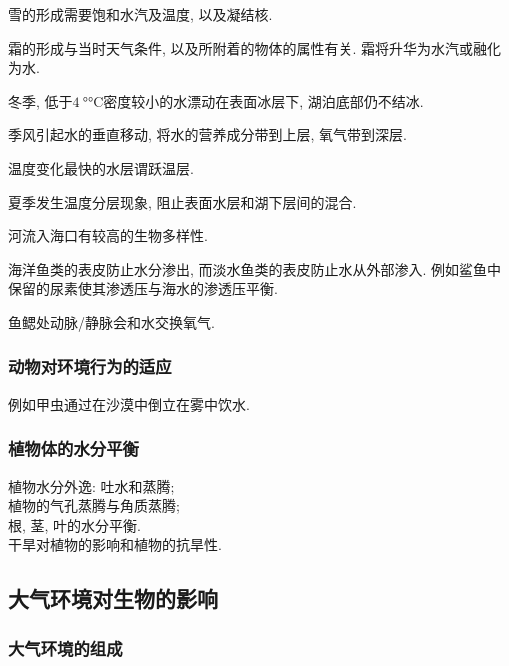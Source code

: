 \documentclass{ctexart}
\begin{document}
雪的形成需要饱和水汽及温度, 以及凝结核.
\par
霜的形成与当时天气条件, 以及所附着的物体的属性有关. 霜将升华为水汽或融化为水.
\begin{cenum}
    \item 冬季, 低于$\SI{4}{\degree\celsius}$密度较小的水漂动在表面冰层下, 湖泊底部仍不结冰.
    \item 季风引起水的垂直移动, 将水的营养成分带到上层, 氧气带到深层.
    \item 温度变化最快的水层谓跃温层.
    \item 夏季发生温度分层现象, 阻止表面水层和湖下层间的混合.
\end{cenum}
河流入海口有较高的生物多样性.
\par
海洋鱼类的表皮防止水分渗出, 而淡水鱼类的表皮防止水从外部渗入. 例如鲨鱼中保留的尿素使其渗透压与海水的渗透压平衡.
\par
鱼鳃处动脉/静脉会和水交换氧气.


\subsubsection{动物对环境行为的适应} %
\label{ssub:动物对环境行为的适应}

例如甲虫通过在沙漠中倒立在雾中饮水.


\subsubsection{植物体的水分平衡} %
\label{ssub:植物体的水分平衡}

植物水分外逸: 吐水和蒸腾;\\
植物的气孔蒸腾与角质蒸腾;\\
根, 茎, 叶的水分平衡.\\
干旱对植物的影响和植物的抗旱性.



\subsection{大气环境对生物的影响} %
\label{sub:大气环境对生物的影响}

\subsubsection{大气环境的组成} %
\label{ssub:大气环境的组成}
\end{document}
